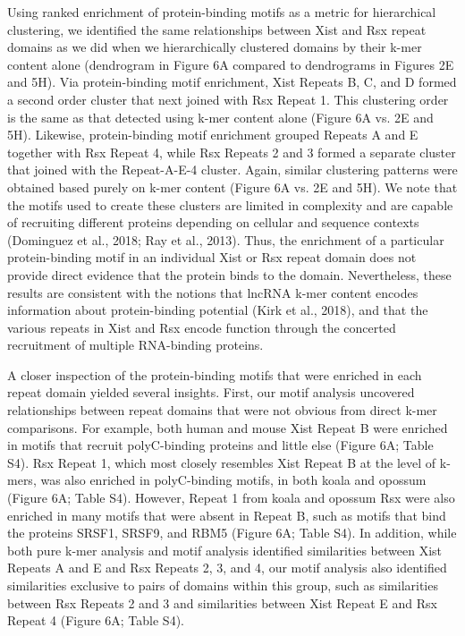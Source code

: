 Using ranked enrichment of protein-binding motifs as a metric for hierarchical clustering, we  identified the same relationships between Xist and Rsx repeat domains as we did when we hierarchically clustered domains by their k-mer content alone (dendrogram in Figure 6A compared to dendrograms in Figures 2E and 5H). Via protein-binding motif enrichment, Xist Repeats B, C, and D formed a second order cluster that next joined with Rsx Repeat 1.  This clustering order is the same as that detected using k-mer content alone (Figure 6A vs. 2E and 5H). Likewise, protein-binding motif enrichment grouped Repeats A and E together with Rsx Repeat 4, while Rsx Repeats 2 and 3 formed a separate cluster that joined with the Repeat-A-E-4 cluster. Again, similar clustering patterns were obtained based purely on k-mer content (Figure 6A vs. 2E and 5H). We note that the motifs used to create these clusters are limited in complexity and are capable of recruiting different proteins depending on cellular and sequence contexts (Dominguez et al., 2018; Ray et al., 2013). Thus, the enrichment of a particular protein-binding motif in an individual Xist or Rsx repeat domain does not provide direct evidence that the protein binds to the domain. Nevertheless, these results are consistent with the notions that lncRNA k-mer content encodes information about protein-binding potential (Kirk et al., 2018), and that the various repeats in Xist and Rsx encode function through the concerted recruitment of multiple RNA-binding proteins.

A closer inspection of the protein-binding motifs that were enriched in each repeat domain yielded several insights. First, our motif analysis uncovered relationships between repeat domains that were not obvious from direct k-mer comparisons. For example, both human and mouse Xist Repeat B were enriched in motifs that recruit polyC-binding proteins and little else (Figure 6A; Table S4). Rsx Repeat 1, which most closely resembles Xist Repeat B at the level of k-mers, was also enriched in polyC-binding motifs, in both koala and opossum (Figure 6A; Table S4). However, Repeat 1 from koala and opossum Rsx were also enriched in many motifs that were absent in Repeat B, such as motifs that bind the proteins SRSF1, SRSF9, and RBM5 (Figure 6A; Table S4). In addition, while both pure k-mer analysis and motif analysis identified similarities between Xist Repeats A and E and Rsx Repeats 2, 3, and 4, our motif analysis also identified similarities exclusive to pairs of domains within this group, such as similarities between Rsx Repeats 2 and 3 and similarities between Xist Repeat E and Rsx Repeat 4 (Figure 6A; Table S4). 

